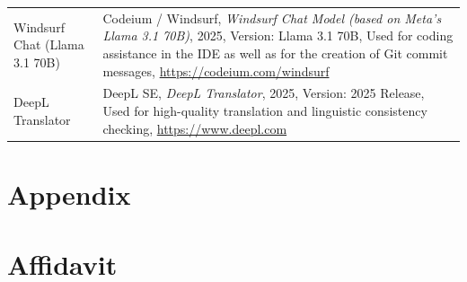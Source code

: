 \documentclass[12pt,a4paper]{article}
\begin{document}
\begin{table}[H]
\begin{threeparttable}
\begin{tabular}{p{4cm} p{12cm}}
			Windsurf Chat (Llama 3.1 70B) &
			Codeium / Windsurf, \textit{Windsurf Chat Model (based on Meta’s Llama 3.1 70B)}, 2025, Version: Llama 3.1 70B, Used for coding assistance in the IDE as well as for the creation of Git commit messages, \url{https://codeium.com/windsurf}                                                                                                                                                                                                                       \\

			DeepL Translator              &
			DeepL SE, \textit{DeepL Translator}, 2025, Version: 2025 Release, Used for high-quality translation and linguistic consistency checking, \url{https://www.deepl.com}                                                                                                                                                                                                                                                                                               \\
			\bottomrule
		\end{tabular}
	\end{threeparttable}
\end{table}

\newpage
\appendix
\section{Appendix}

\newpage

\section{Affidavit}

\end{document}
